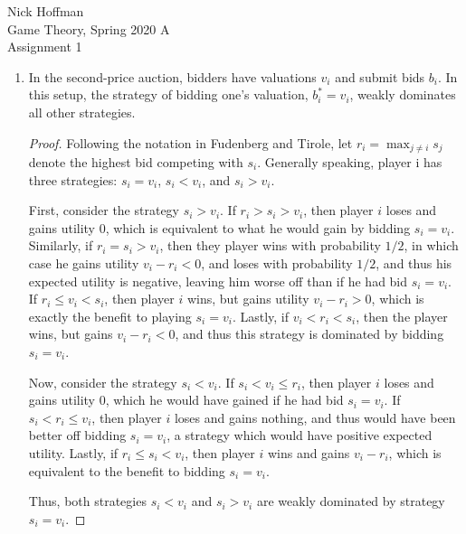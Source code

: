 \documentclass[11pt]{article}
\begin{document}
\begin{flushleft}
	Nick Hoffman \\
	Game Theory, Spring 2020 A \\
	Assignment 1 \\
\end{flushleft}

\begin{enumerate}
	\item In the second-price auction, bidders have valuations $ v_i $ and submit bids $ b_i $. In this setup, the strategy of bidding one's valuation, $ b_i^* = v_i $, weakly dominates all other strategies.
	
	\begin{proof}
		Following the notation in Fudenberg and Tirole, let $ r_i = \max_{j\neq i} s_j $ denote the highest bid competing with $ s_i $. Generally speaking, player i has three strategies: $ s_i = v_i $, $ s_i < v_i $, and $ s_i > v_i $. 
		
		First, consider the strategy $ s_i > v_i $. If $ r_i > s_i > v_i $, then player $ i $ loses and gains utility 0, which is equivalent to what he would gain by bidding $ s_i = v_i $. Similarly, if $ r_i = s_i > v_i $, then they player wins with probability $ 1/2 $, in which case he gains utility $ v_i - r_i < 0 $, and loses with probability $ 1/2 $, and thus his expected utility is negative, leaving him worse off than if he had bid $ s_i = v_i $. If $ r_i \leq v_i < s_i $, then player $ i $ wins, but gains utility $ v_i - r_i > 0 $, which is exactly the benefit to playing $ s_i = v_i $. Lastly, if $ v_i < r_i < s_i $, then the player wins, but gains $ v_i - r_i < 0 $, and thus this strategy is dominated by bidding $ s_i = v_i $.
		
		Now, consider the strategy $ s_i < v_i $. If $ s_i < v_i \leq r_i $, then player $ i $ loses and gains utility 0, which he would have gained if he had bid $ s_i = v_i $. If $ s_i < r_i \leq v_i $, then player $ i $ loses and gains nothing, and thus would have been better off bidding $ s_i = v_i $, a strategy which would have positive expected utility. Lastly, if $ r_i \leq s_i < v_i $, then player $ i $ wins and gains $ v_i - r_i $, which is equivalent to the benefit to bidding $ s_i = v_i $.
		
		Thus, both strategies $ s_i < v_i $ and $ s_i > v_i $ are weakly dominated by strategy $ s_i = v_i $. 
	\end{proof} 


\end{enumerate}
\end{document}
